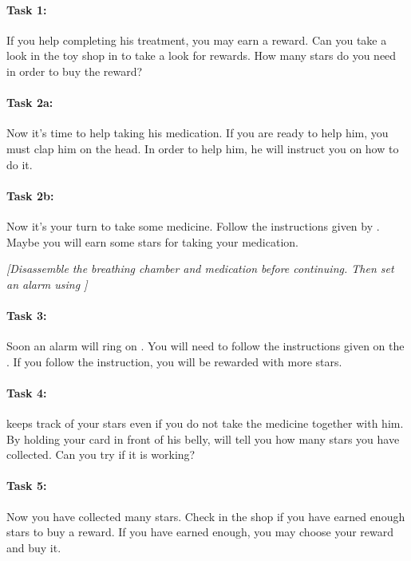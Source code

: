 \paragraph{Task 1:}

If you help \ab{} completing his treatment, you may earn a reward. Can you take a look in the toy shop in \app{} to take a look for rewards. How many stars do you need in order to buy the reward?


\paragraph{Task 2a:}

Now it's time to help \ab{} taking his medication. If you are ready to help him, you must clap him on the head. In order to help him, he will instruct you on how to do it. 


\paragraph{Task 2b:}

Now it's your turn to take some medicine. Follow the instructions given by \ab{}. Maybe you will earn some stars for taking your medication.

\emph{[Disassemble the breathing chamber and medication before continuing. Then set an alarm using \app{}]}


\paragraph{Task 3:}

Soon an alarm will ring on \app{}. You will need to follow the instructions given on the \app{}. If you follow the instruction, you will be rewarded with more stars. 


\paragraph{Task 4:} 
\ab{} keeps track of your stars even if you do not take the medicine together with him. By holding your card in front of his belly, \ab{} will tell you how many stars you have collected. Can you try if it is working?


\paragraph{Task 5:}
Now you have collected many stars. Check in the shop if you have earned enough stars to buy a reward. If you have earned enough, you may choose your reward and buy it. 


